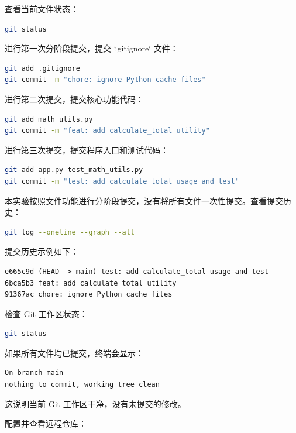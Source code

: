 \documentclass[UTF8,12pt,a4paper]{ctexart}
\begin{document}
查看当前文件状态：

\begin{lstlisting}[language=bash]
git status
\end{lstlisting}

进行第一次分阶段提交，提交 `.gitignore` 文件：

\begin{lstlisting}[language=bash]
git add .gitignore
git commit -m "chore: ignore Python cache files"
\end{lstlisting}

进行第二次提交，提交核心功能代码：

\begin{lstlisting}[language=bash]
git add math_utils.py
git commit -m "feat: add calculate_total utility"
\end{lstlisting}

进行第三次提交，提交程序入口和测试代码：

\begin{lstlisting}[language=bash]
git add app.py test_math_utils.py
git commit -m "test: add calculate_total usage and test"
\end{lstlisting}

本实验按照文件功能进行分阶段提交，没有将所有文件一次性提交。查看提交历史：

\begin{lstlisting}[language=bash]
git log --oneline --graph --all
\end{lstlisting}

提交历史示例如下：

\begin{lstlisting}
e665c9d (HEAD -> main) test: add calculate_total usage and test
6bca5b3 feat: add calculate_total utility
91367ac chore: ignore Python cache files
\end{lstlisting}

检查 Git 工作区状态：

\begin{lstlisting}[language=bash]
git status
\end{lstlisting}

如果所有文件均已提交，终端会显示：

\begin{lstlisting}
On branch main
nothing to commit, working tree clean
\end{lstlisting}

这说明当前 Git 工作区干净，没有未提交的修改。

配置并查看远程仓库：
\end{document}
